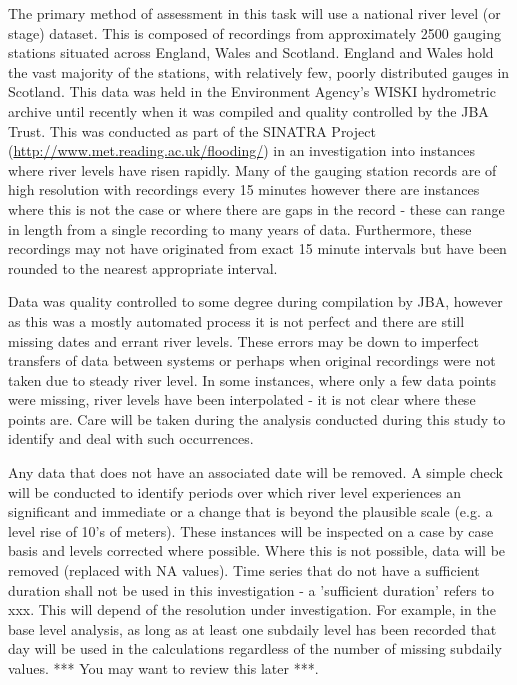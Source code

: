 \documentclass[DIV=calc, paper=a4, fontsize=11pt, twocolumn]{scrartcl}	 %
\begin{document}
The primary method of assessment in this task will use a national river level (or stage) dataset. This is composed of recordings from approximately 2500 gauging stations situated across England, Wales and Scotland. England and Wales hold the vast majority of the stations, with relatively few, poorly distributed gauges in Scotland. This data was held in the Environment Agency's WISKI hydrometric archive until recently when it was compiled and quality controlled by the JBA Trust. This was conducted as part of the SINATRA Project (\url{http://www.met.reading.ac.uk/flooding/}) in an investigation into instances where river levels have risen rapidly. Many of the gauging station records are of high resolution with recordings every 15 minutes however there are instances where this is not the case or where there are gaps in the record - these can range in length from a single recording to many years of data. Furthermore, these recordings may not have originated from exact 15 minute intervals but have been rounded to the nearest appropriate interval.

Data was quality controlled to some degree during compilation by JBA, however as this was a mostly automated process it is not perfect and there are still missing dates and errant river levels. These errors may be down to imperfect transfers of data between systems or perhaps when original recordings were not taken due to steady river level. In some instances, where only a few data points were missing, river levels have been interpolated - it is not clear where these points are. Care will be taken during the analysis conducted during this study to identify and deal with such occurrences.

Any data that does not have an associated date will be removed. A simple check will be conducted to identify periods over which river level experiences an significant and immediate or a change that is beyond the plausible scale (e.g. a level rise of 10's of meters). These instances will be inspected on a case by case basis and levels corrected where possible. Where this is not possible, data will be removed (replaced with NA values). Time series that do not have a sufficient duration shall not be used in this investigation - a 'sufficient duration' refers to xxx. This will depend of the resolution under investigation. For example, in the base level analysis, as long as at least one subdaily level has been recorded that day will be used in the calculations regardless of the number of missing subdaily values. *** You may want to review this later ***.
\end{document}

